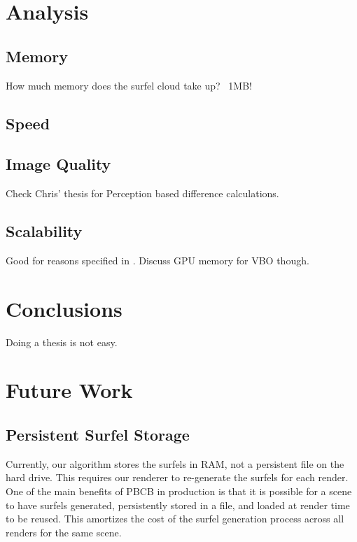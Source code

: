 \section{Analysis}
\label{sec:analysis}

\subsection{Memory}
How much memory does the surfel cloud take up? ~1MB!

\subsection{Speed}

\subsection{Image Quality}
Check Chris' thesis for Perception based difference calculations.

\subsection{Scalability}
Good for reasons specified in \cite{bib:christensen2008}. Discuss GPU memory for VBO though.

\section{Conclusions}
Doing a thesis is not easy.

\section{Future Work}
\label{sec:future_work}

\subsection{Persistent Surfel Storage}
Currently, our algorithm stores the surfels in RAM, not a persistent file on the hard drive. This requires our renderer to re-generate the surfels for each render. One of the main benefits of PBCB in production is that it is possible for a scene to have surfels generated, persistently stored in a file, and loaded at render time to be reused. This amortizes the cost of the surfel generation process across all renders for the same scene.

